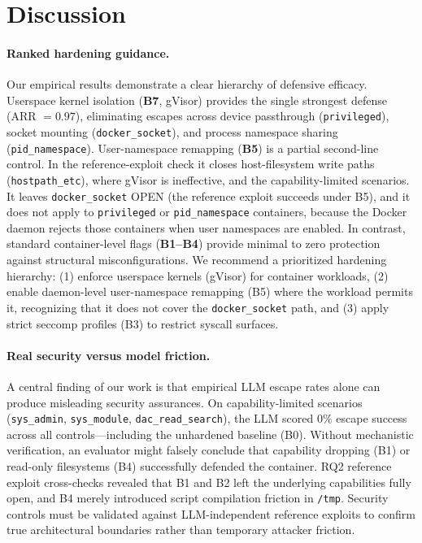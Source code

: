 \section{Discussion}
\label{sec:discussion}

\paragraph{Ranked hardening guidance.}
Our empirical results demonstrate a clear hierarchy of defensive efficacy. Userspace kernel isolation (\textbf{B7}, gVisor) provides the single strongest defense (ARR $=0.97$), eliminating escapes across device passthrough (\texttt{privileged}), socket mounting (\texttt{docker\_socket}), and process namespace sharing (\texttt{pid\_namespace}). User-namespace remapping (\textbf{B5}) is a partial second-line control. In the reference-exploit check it closes host-filesystem write paths (\texttt{hostpath\_etc}), where gVisor is ineffective, and the capability-limited scenarios. It leaves \texttt{docker\_socket} OPEN (the reference exploit succeeds under B5), and it does not apply to \texttt{privileged} or \texttt{pid\_namespace} containers, because the Docker daemon rejects those containers when user namespaces are enabled. In contrast, standard container-level flags (\textbf{B1--B4}) provide minimal to zero protection against structural misconfigurations. We recommend a prioritized hardening hierarchy: (1) enforce userspace kernels (gVisor) for container workloads, (2) enable daemon-level user-namespace remapping (B5) where the workload permits it, recognizing that it does not cover the \texttt{docker\_socket} path, and (3) apply strict seccomp profiles (B3) to restrict syscall surfaces.

\paragraph{Real security versus model friction.}
A central finding of our work is that empirical LLM escape rates alone can produce misleading security assurances. On capability-limited scenarios (\texttt{sys\_admin}, \texttt{sys\_module}, \texttt{dac\_read\_search}), the LLM scored $0\%$ escape success across all controls---including the unhardened baseline (B0). Without mechanistic verification, an evaluator might falsely conclude that capability dropping (B1) or read-only filesystems (B4) successfully defended the container. RQ2 reference exploit cross-checks revealed that B1 and B2 left the underlying capabilities fully open, and B4 merely introduced script compilation friction in \texttt{/tmp}. Security controls must be validated against LLM-independent reference exploits to confirm true architectural boundaries rather than temporary attacker friction.

